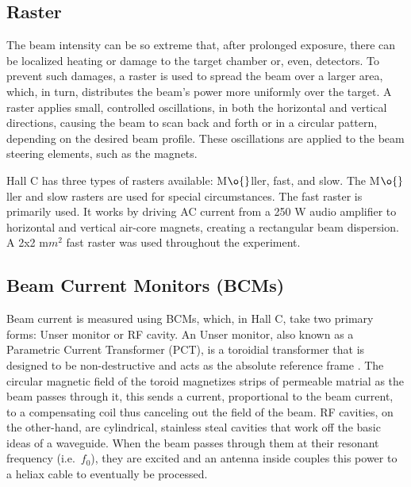 \documentclass[
]{report}
\begin{document}
\hypertarget{raster}{%
\subsection{Raster}\label{raster}}

The beam intensity can be so extreme that, after prolonged exposure,
there can be localized heating or damage to the target chamber or, even,
detectors. To prevent such damages, a raster is used to spread the beam
over a larger area, which, in turn, distributes the beam's power more
uniformly over the target. A raster applies small, controlled
oscillations, in both the horizontal and vertical directions, causing
the beam to scan back and forth or in a circular pattern, depending on
the desired beam profile. These oscillations are applied to the beam
steering elements, such as the magnets.



Hall C has three types of rasters available: M\(\o{}\)ller, fast, and
slow. The M\(\o{}\)ller and slow rasters are used for special
circumstances. The fast raster is primarily used. It works by driving AC
current from a 250 W audio amplifier to horizontal and vertical air-core
magnets, creating a rectangular beam dispersion. A 2x2 m\(m^2\) fast
raster was used throughout the experiment.

\hypertarget{beam-current-monitors-bcms}{%
\subsection{Beam Current Monitors
(BCMs)}\label{beam-current-monitors-bcms}}

Beam current is measured using BCMs, which, in Hall C, take two primary
forms: Unser monitor or RF cavity. An Unser monitor, also known as a
Parametric Current Transformer (PCT), is a toroidial transformer that is
designed to be non-destructive and acts as the absolute reference frame
\cite{unser_parametric_1992}. The circular magnetic field of the toroid
magnetizes strips of permeable matrial as the beam passes through it,
this sends a current, proportional to the beam current, to a
compensating coil thus canceling out the field of the beam. RF cavities,
on the other-hand, are cylindrical, stainless steal cavities that work
off the basic ideas of a waveguide. When the beam passes through them at
their resonant frequency (i.e.~\(f_0\)), they are excited and an antenna
inside couples this power to a heliax cable to eventually be processed.
\end{document}
